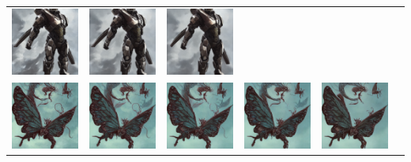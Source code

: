 \begin{table}[!htb]
\begin{tabular}{c c@{}c@{}c@{}c@{}c}
    \includegraphics[width=0.155\linewidth]{chapter/appendix/def_imgs/ironman/im_30.png} &
    \includegraphics[width=0.155\linewidth]{chapter/appendix/def_imgs/ironman/im_40.png} &
    \includegraphics[width=0.155\linewidth]{chapter/appendix/def_imgs/ironman/im_50.png} \\
    \includegraphics[width=0.155\linewidth]{chapter/appendix/def_imgs/butterfly/b_0.png} & 
    \includegraphics[width=0.155\linewidth]{chapter/appendix/def_imgs/butterfly/b_10.png} &
    \includegraphics[width=0.155\linewidth]{chapter/appendix/def_imgs/butterfly/b_20.png} &
    \includegraphics[width=0.155\linewidth]{chapter/appendix/def_imgs/butterfly/b_30.png} &
    \includegraphics[width=0.155\linewidth]{chapter/appendix/def_imgs/butterfly/b_40.png} &

\end{tabular}
\end{table}
